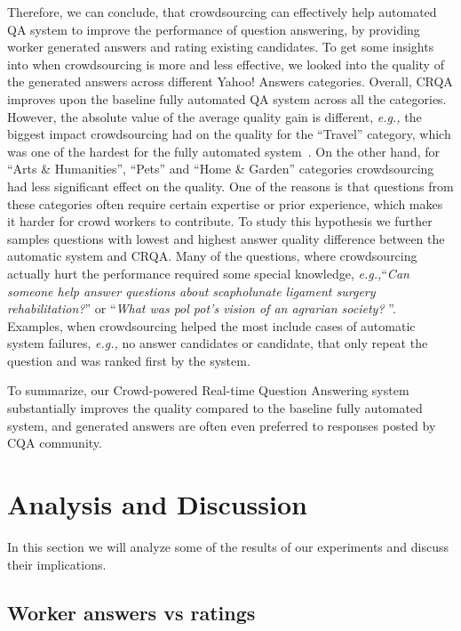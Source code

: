 \documentclass[letterpaper]{article}
\makeatletter
\newcommand{\eg}{\textit{e.g.,}\@\xspace}
\makeatother
\begin{document}
Therefore, we can conclude, that crowdsourcing can effectively help automated QA system to improve the performance of question answering, by providing worker generated answers and rating existing candidates.
To get some insights into when crowdsourcing is more and less effective, we looked into the quality of the generated answers across different Yahoo! Answers categories.
Overall, CRQA improves upon the baseline fully automated QA system across all the categories.
However, the absolute value of the average quality gain is different, \eg the biggest impact crowdsourcing had on the quality for the ``Travel'' category, which was one of the hardest for the fully automated system~\cite{savenkov_trecliveqa15}.
On the other hand, for ``Arts \& Humanities'', ``Pets'' and ``Home \& Garden'' categories crowdsourcing had less significant effect on the quality.
One of the reasons is that questions from these categories often require certain expertise or prior experience, which makes it harder for crowd workers to contribute.
To study this hypothesis we further samples questions with lowest and highest answer quality difference between the automatic system and CRQA.
Many of the questions, where crowdsourcing actually hurt the performance required some special knowledge, \eg ``\textit{Can someone help answer questions about scapholunate ligament surgery rehabilitation?}'' or ``\textit{What was pol pot's vision of an agrarian society? }''.
Examples, when crowdsourcing helped the most include cases of automatic system failures, \eg no answer candidates or candidate, that only repeat the question and was ranked first by the system.

To summarize, our Crowd-powered Real-time Question Answering system substantially improves the quality compared to the baseline fully automated system, and generated answers are often even preferred to responses posted by CQA community.

\section{Analysis and Discussion}
\label{sec:analysis}

In this section we will analyze some of the results of our experiments and discuss their implications.

\subsection{Worker answers vs ratings}
\label{sec:analysis:answers_vs_ratings}
\end{document}

